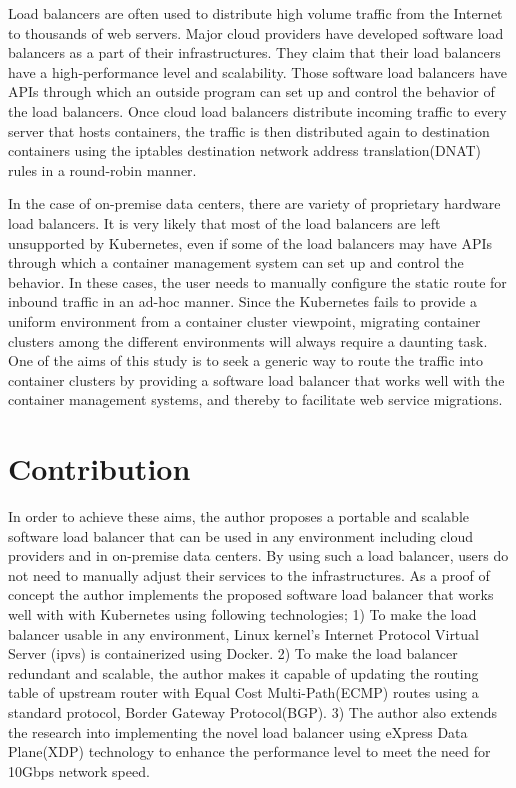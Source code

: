 Load balancers are often used to distribute high volume traffic from the Internet to thousands of web servers.
Major cloud providers have developed software load balancers\cite{eisenbud2016maglev,patel2013ananta} as a part of their infrastructures.
They claim that their load balancers have a high-performance level and scalability.
Those software load balancers have APIs through which an outside program can set up and control the behavior of the load balancers.
Once cloud load balancers distribute incoming traffic to every server that hosts containers,
the traffic is then distributed again to destination containers using the iptables destination network address translation(DNAT)\cite{MartinA.Brown2017,Marmol2015} rules in a round-robin manner.

In the case of on-premise data centers, there are variety of proprietary hardware load balancers.
It is very likely that most of the load balancers are left unsupported by Kubernetes, even if some of the load balancers may have APIs through which a container management system can set up and control the behavior.
In these  cases, the user needs to manually configure the static route for inbound traffic in an ad-hoc manner.
Since the Kubernetes fails to provide a uniform environment from a container cluster viewpoint, migrating container clusters among the different environments will always require a daunting task.
One of the aims of this study is to seek a generic way to route the traffic into container clusters by providing a software load balancer that works well with the container management systems, and thereby to facilitate web service migrations.

\section{Contribution}

In order to achieve these aims, the author proposes a portable and scalable software load balancer that can be used in any environment including cloud providers and in on-premise data centers.
By using such a load balancer, users do not need to manually adjust their services to the infrastructures.
As a proof of concept the author implements the proposed software load balancer that works well with with Kubernetes using following technologies;
1) To make the load balancer usable in any environment, Linux kernel's Internet Protocol Virtual Server (ipvs)\cite{Zhang2000} is containerized using Docker\cite{merkel2014docker}. 
2) To make the load balancer redundant and scalable, the author makes it capable of updating the routing table of upstream router with Equal Cost Multi-Path(ECMP) routes\cite{al2008scalable} using a standard protocol, Border Gateway Protocol(BGP).
3) The author also extends the research into implementing the novel load balancer using eXpress Data Plane(XDP) technology\cite{bertin2017xdp} to enhance the performance level to meet the need for 10Gbps network speed.

